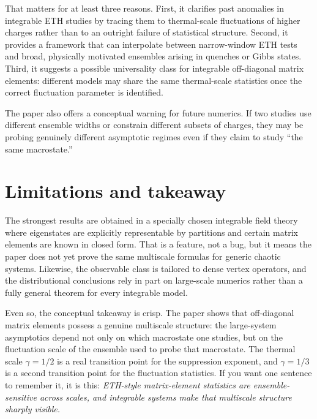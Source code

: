 \documentclass[11pt]{article}
\begin{document}
That matters for at least three reasons. First, it clarifies past anomalies in integrable ETH studies by tracing them to thermal-scale fluctuations of higher charges rather than to an outright failure of statistical structure. Second, it provides a framework that can interpolate between narrow-window ETH tests and broad, physically motivated ensembles arising in quenches or Gibbs states. Third, it suggests a possible universality class for integrable off-diagonal matrix elements: different models may share the same thermal-scale statistics once the correct fluctuation parameter is identified.

The paper also offers a conceptual warning for future numerics. If two studies use different ensemble widths or constrain different subsets of charges, they may be probing genuinely different asymptotic regimes even if they claim to study ``the same macrostate.''

\section*{Limitations and takeaway}
The strongest results are obtained in a specially chosen integrable field theory where eigenstates are explicitly representable by partitions and certain matrix elements are known in closed form. That is a feature, not a bug, but it means the paper does not yet prove the same multiscale formulas for generic chaotic systems. Likewise, the observable class is tailored to dense vertex operators, and the distributional conclusions rely in part on large-scale numerics rather than a fully general theorem for every integrable model.

Even so, the conceptual takeaway is crisp. The paper shows that off-diagonal matrix elements possess a genuine multiscale structure: the large-system asymptotics depend not only on which macrostate one studies, but on the fluctuation scale of the ensemble used to probe that macrostate. The thermal scale $\gamma=1/2$ is a real transition point for the suppression exponent, and $\gamma=1/3$ is a second transition point for the fluctuation statistics. If you want one sentence to remember it, it is this: \emph{ETH-style matrix-element statistics are ensemble-sensitive across scales, and integrable systems make that multiscale structure sharply visible.}
\end{document}
